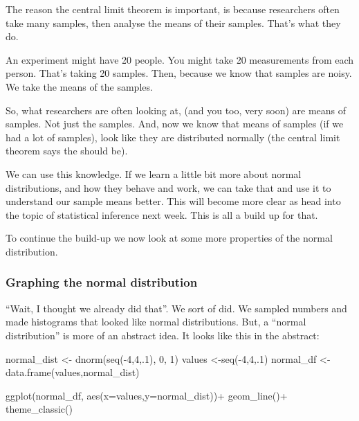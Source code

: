 \documentclass[
]{book}
\newenvironment{Shaded}{\begin{snugshade}}{\end{snugshade}}
\newcommand{\AttributeTok}[1]{\textcolor[rgb]{0.77,0.63,0.00}{#1}}
\newcommand{\DecValTok}[1]{\textcolor[rgb]{0.00,0.00,0.81}{#1}}
\newcommand{\FunctionTok}[1]{\textcolor[rgb]{0.00,0.00,0.00}{#1}}
\newcommand{\NormalTok}[1]{#1}
\newcommand{\OtherTok}[1]{\textcolor[rgb]{0.56,0.35,0.01}{#1}}
\newcommand{\SpecialCharTok}[1]{\textcolor[rgb]{0.00,0.00,0.00}{#1}}
\begin{document}
The reason the central limit theorem is important, is because researchers often take many samples, then analyse the means of their samples. That's what they do.

An experiment might have 20 people. You might take 20 measurements from each person. That's taking 20 samples. Then, because we know that samples are noisy. We take the means of the samples.

So, what researchers are often looking at, (and you too, very soon) are means of samples. Not just the samples. And, now we know that means of samples (if we had a lot of samples), look like they are distributed normally (the central limit theorem says the should be).

We can use this knowledge. If we learn a little bit more about normal distributions, and how they behave and work, we can take that and use it to understand our sample means better. This will become more clear as head into the topic of statistical inference next week. This is all a build up for that.

To continue the build-up we now look at some more properties of the normal distribution.

\hypertarget{graphing-the-normal-distribution}{%
\subsubsection{Graphing the normal distribution}\label{graphing-the-normal-distribution}}

``Wait, I thought we already did that''. We sort of did. We sampled numbers and made histograms that looked like normal distributions. But, a ``normal distribution'' is more of an abstract idea. It looks like this in the abstract:

\begin{Shaded}
\begin{Highlighting}[]
\NormalTok{normal\_dist }\OtherTok{\textless{}{-}} \FunctionTok{dnorm}\NormalTok{(}\FunctionTok{seq}\NormalTok{(}\SpecialCharTok{{-}}\DecValTok{4}\NormalTok{,}\DecValTok{4}\NormalTok{,.}\DecValTok{1}\NormalTok{), }\DecValTok{0}\NormalTok{, }\DecValTok{1}\NormalTok{)}
\NormalTok{values }\OtherTok{\textless{}{-}}\FunctionTok{seq}\NormalTok{(}\SpecialCharTok{{-}}\DecValTok{4}\NormalTok{,}\DecValTok{4}\NormalTok{,.}\DecValTok{1}\NormalTok{)}
\NormalTok{normal\_df }\OtherTok{\textless{}{-}}\FunctionTok{data.frame}\NormalTok{(values,normal\_dist)}

\FunctionTok{ggplot}\NormalTok{(normal\_df, }\FunctionTok{aes}\NormalTok{(}\AttributeTok{x=}\NormalTok{values,}\AttributeTok{y=}\NormalTok{normal\_dist))}\SpecialCharTok{+}
  \FunctionTok{geom\_line}\NormalTok{()}\SpecialCharTok{+}
  \FunctionTok{theme\_classic}\NormalTok{()}
\end{Highlighting}
\end{Shaded}
\end{document}
